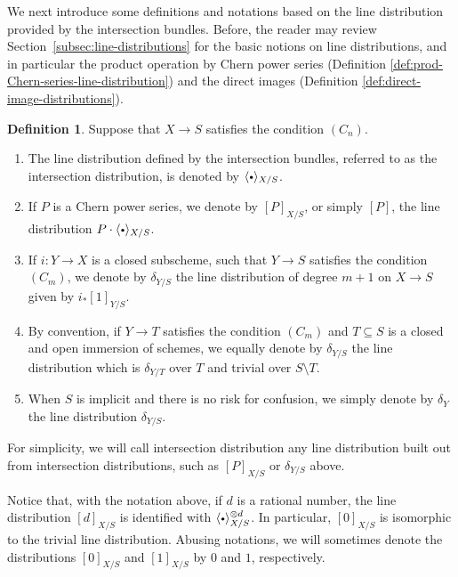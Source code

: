 \documentclass[JEP,XML,SOM,Unicode,published]{cedram}
\newcommand{\sbullet}{{\scriptscriptstyle\bullet}}
\newcommand{\csbullet}{{\raisebox{1pt}{$\sbullet$}}}
\theoremstyle{plain}
\theoremstyle{definition}
\newtheorem{definition}[theorem]{Definition}
\begin{document}
We next introduce some definitions and notations based on the line distribution provided by the intersection bundles. Before, the reader may review Section~\ref{subsec:line-distributions} for the basic notions on line distributions, and in particular the product operation by Chern power series (\cf Definition \ref{def:prod-Chern-series-line-distribution}) and the direct images (\cf Definition \ref{def:direct-image-distributions}).

\begin{definition}\label{definition:intersectiondistribution}
Suppose that $X\to S$ satisfies the condition $(C_n)$.

\begin{enumerate}
\item The line distribution defined by the intersection bundles, referred to as the intersection distribution, is denoted by $\langle \csbullet \rangle_{X/S}$.
\item If $P$ is a Chern power series, we denote by $[ P ]_{X/S}$, or simply $[P]$, the line distribution $P \cdot \langle \csbullet \rangle_{X/S}$.
\item If $i\colon Y \to X$ is a closed subscheme, such that $Y \to S$ satisfies the condition $(C_m)$, we denote by $\delta_{Y/S}$ the line distribution of degree $m+1$ on $X \to S$ given by $i_\ast[ 1 ]_{Y/S} $.
\item By convention, if $Y \to T$ satisfies the condition $(C_m)$ and $T \subseteq S$ is a closed and open immersion of schemes, we equally denote by $\delta_{Y/S}$ the line distribution which is $\delta_{Y/T}$ over $T$ and trivial over $S\setminus T$.
\item When $S$ is implicit and there is no risk for confusion, we simply denote by $\delta_{Y}$ the line distribution $\delta_{Y/S}$.
\end{enumerate}
\end{definition}

For simplicity, we will call intersection distribution any line distribution built out from intersection distributions, such as $[P]_{X/S}$ or $\delta_{Y/S}$ above.

Notice that, with the notation above, if $d$ is a rational number, the line distribution $[d]_{X/S}$ is identified with $\langle\csbullet\rangle_{X/S}^{\otimes d}$. In particular, $[0]_{X/S}$ is isomorphic to the trivial line distribution. Abusing notations, we will sometimes denote the distributions $[0]_{X/S}$ and $[1]_{X/S}$ by $0$ and $1$, respectively.
\end{document}
